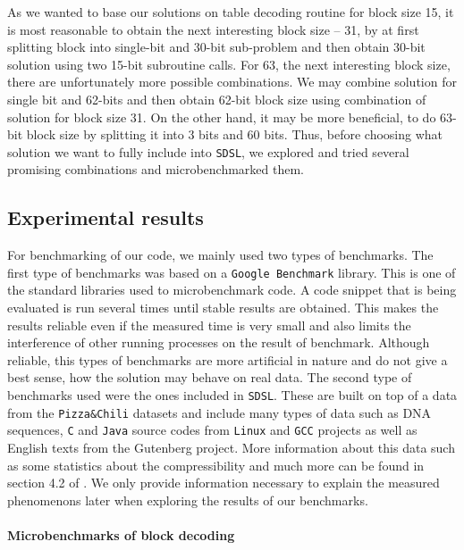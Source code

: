 As we wanted to base our solutions on table decoding routine for block size 15, it is most
reasonable to obtain the next interesting block size -- 31, by at first splitting block into
single-bit and 30-bit sub-problem and then obtain 30-bit solution using two 15-bit
subroutine calls. For 63, the next interesting block size, there are unfortunately more
possible combinations. We may combine solution for single bit and 62-bits
and then obtain 62-bit block size using combination of solution for block size 31. On the
other hand, it may be more beneficial, to do 63-bit block size by splitting it into 3 bits
and 60 bits. Thus, before choosing what solution we want to fully include into \texttt{SDSL},
we explored and tried several promising combinations and microbenchmarked them.

\subsection{Experimental results}

For benchmarking of our code, we mainly used two types of benchmarks. The first type of benchmarks
was based on a \texttt{Google Benchmark} library. This is one of the standard libraries used to
microbenchmark code. A code snippet that is being evaluated is run several times until
stable results are obtained. This makes the results reliable even if the measured time is
very small and also limits the interference of other running processes on the result of
benchmark. Although reliable, this types of benchmarks are more artificial in nature and
do not give a best sense, how the solution may behave on real data. The second type of
benchmarks used were the ones included in \texttt{SDSL}. These are built on top
of a data from the \texttt{Pizza\&Chili} datasets \citep{ferragina2005pizza} and include
many types of data such as DNA sequences, \texttt{C} and \texttt{Java} source codes from
\texttt{Linux} and \texttt{GCC} projects as well as English texts from the Gutenberg project.
More information about this data such as some statistics about the compressibility and much
more can be found in section 4.2 of \cite{ferragina2009compressed}. We only provide information
necessary to explain the measured phenomenons later when exploring the results of our benchmarks. 

\paragraph{Microbenchmarks of block decoding}

